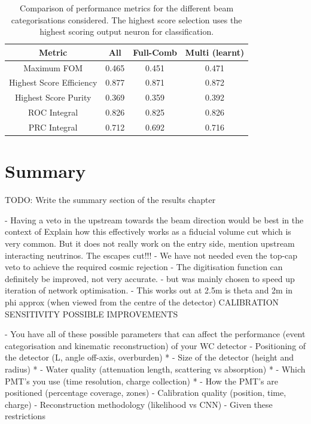 \begin{table}
    \begin{tabular}{cccc}
        Metric                   & All   & Full-Comb & Multi (learnt) \\
        \midrule
        Maximum FOM              & 0.465 & 0.451     & 0.471          \\
        Highest Score Efficiency & 0.877 & 0.871     & 0.872          \\
        Highest Score Purity     & 0.369 & 0.359     & 0.392          \\
        ROC Integral             & 0.826 & 0.825     & 0.826          \\
        PRC Integral             & 0.712 & 0.692     & 0.716          \\
    \end{tabular}
    \caption[Comparison of performance metrics for the different beam categorisations considered.]
    {Comparison of performance metrics for the different beam categorisations considered. The highest
        score selection uses the highest scoring output neuron for classification.}
    \label{tab:cat}
\end{table}

\section{Summary} %
\label{sec:results_summary} %

TODO: Write the summary section of the results chapter

- Having a veto in the upstream towards the beam direction would be best in the context of Explain
how this effectively works as a fiducial volume cut which is very common. But it does not really
work on the entry side, mention upstream interacting neutrinos. The escapes cut!!!
- We have not needed even the top-cap veto to achieve the required cosmic rejection
- The digitisation function can definitely be improved, not very accurate.
- but was mainly chosen to speed up iteration of network optimisation.
- This works out at 2.5m is theta and 2m in phi approx (when viewed from the centre of the
detector)
CALIBRATION SENSITIVITY
POSSIBLE IMPROVEMENTS

- You have all of these possible parameters that can affect the performance (event categorisation
and kinematic reconstruction) of your WC detector
- Positioning of the detector (L, angle off-axis, overburden) *
- Size of the detector (height and radius) *
- Water quality (attenuation length, scattering vs absorption) *
- Which PMT’s you use (time resolution, charge collection) *
- How the PMT’s are positioned (percentage coverage, zones)
- Calibration quality (position, time, charge)
- Reconstruction methodology (likelihood vs CNN)
- Given these restrictions

